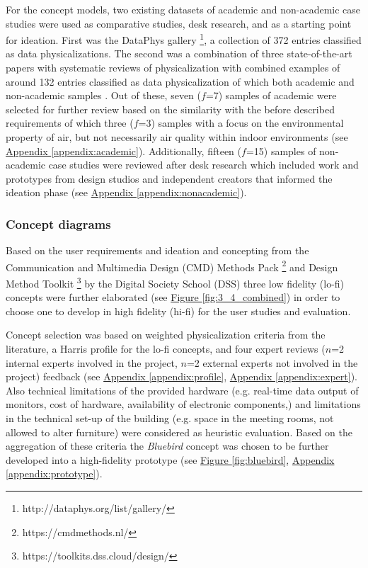 For the concept models, two existing datasets of academic and non-academic case studies were used as comparative studies, desk research, and as a starting point for ideation. First was the DataPhys gallery \footnote{http://dataphys.org/list/gallery/}, a collection of 372 entries classified as data physicalizations. The second was a combination of three state-of-the-art papers with systematic reviews of physicalization with combined examples of around 132 entries classified as data physicalization of which both academic and non-academic samples \cite{sauve_physecology_2022, anhalt_university_germany_design_2022, ranasinghe_encoding_2023}. Out of these, seven ($f$=7) samples of academic were selected for further review based on the similarity with the before described requirements of which three ($f$=3) samples with a focus on the environmental property of air, but not necessarily air quality within indoor environments (see \hyperref[appendix:academic]{Appendix \ref*{appendix:academic}}). Additionally, fifteen ($f$=15) samples of non-academic case studies were reviewed after desk research which included work and prototypes from design studios and independent creators that informed the ideation phase (see \hyperref[appendix:nonacademic]{Appendix \ref*{appendix:nonacademic}}).

\subsubsection{Concept diagrams}

Based on the user requirements and ideation and concepting from the Communication and Multimedia Design (CMD) Methods Pack \footnote{https://cmdmethods.nl/} and Design Method Toolkit \footnote{https://toolkits.dss.cloud/design/} by the Digital Society School (DSS) three low fidelity (lo-fi) concepts were further elaborated (see \hyperref[fig:3_4_combined]{Figure \ref*{fig:3_4_combined}}) in order to choose one to develop in high fidelity (hi-fi) for the user studies and evaluation. 

Concept selection was based on weighted physicalization criteria from the literature, a Harris profile for the lo-fi concepts, and four expert reviews ($n$=2 internal experts involved in the project, $n$=2 external experts not involved in the project) feedback (see \hyperref[appendix:profile]{Appendix \ref*{appendix:profile}}, \hyperref[appendix:expert]{Appendix \ref*{appendix:expert}}). Also technical limitations of the provided hardware (e.g. real-time data output of monitors, cost of hardware, availability of electronic components,) and limitations in the technical set-up of the building (e.g. space in the meeting rooms, not allowed to alter furniture) were considered as heuristic evaluation. Based on the aggregation of these criteria the \textit{Bluebird} concept was chosen to be further developed into a high-fidelity prototype (see \hyperref[fig:bluebird]{Figure \ref*{fig:bluebird}}, \hyperref[appendix:prototype]{Appendix \ref*{appendix:prototype}}).

